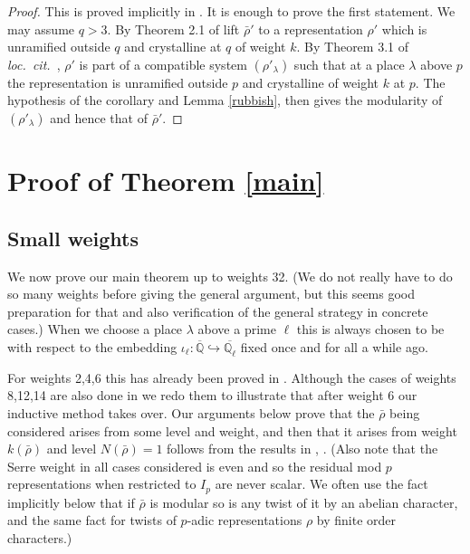 \documentclass[12pt]{amsart}
\newcommand{\aQ}{\overline{\mathbb{Q}}}
\newcommand{\aQl}{\overline{\mathbb{Q}_{\ell}}}
\newcommand{\rhobar}{\overline{\rho}}
\def\rhobar{ {\bar {\rho} } }
\begin{document}
\begin{proof} This is proved implicitly in \cite{KW}.
It is enough to prove the first statement. We may assume $q>3$.
By Theorem 2.1 of \cite{KW} lift $\rhobar'$ to a representation $\rho'$ which is unramified outside $q$ and crystalline at $q$ of weight $k$. By Theorem 3.1
of {\em loc.\ cit.\ }, $\rho'$ is part of a compatible system $(\rho'_\lambda)$
such that at a place $\lambda$ above $p$ the representation is unramified outside $p$ and crystalline of weight $k$ at $p$. The hypothesis of the corollary and Lemma \ref{rubbish}, then gives the modularity of $(\rho'_\lambda)$ and hence that of $\rhobar'$.
\end{proof}

\section{Proof of Theorem \ref{main}}

\subsection{Small weights}

We now prove our main theorem up to weights 32. (We do not really have to do so many weights before giving the general argument, 
but this seems good preparation for that and also verification of the general strategy in concrete cases.) When we choose a place $\lambda$ above a prime $\ell$ this is always chosen to be with respect to the
embedding $\iota_\ell: \aQ \hookrightarrow \aQl$  fixed once and for all a while ago.

For weights 2,4,6 this has already been proved in \cite{KW}.  Although the cases of weights 8,12,14 are also done in \cite{KW}
we redo them to illustrate that after weight 6 our inductive method takes over.
Our arguments below prove that the $\rhobar$ being considered arises from some level and weight, and then that it arises from weight $k(\rhobar)$ and level $N(\rhobar)=1$ follows from the results in \cite{Ribet}, \cite{Edix}.
(Also note that the Serre weight in all cases considered is even and so 
the residual mod $p$ representations when restricted to $I_p$ are never 
scalar. We often use the fact implicitly below that if $\rhobar$ is modular so is any twist of it by an abelian character, and the same fact for twists of $p$-adic representations $\rho$ by finite order characters.)
\end{document}
